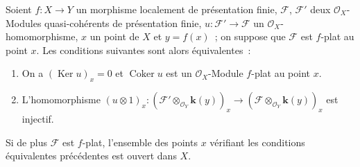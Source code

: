 
\begin{proposition}[11.3.7]
\label{IV.11.3.7-fr}
Soient $f:X\to Y$ un morphisme localement de présentation finie,
$\mathcal F$, $\mathcal F'$ deux $\mathcal O_X$-Modules quasi-cohérents de
présentation finie, $u:\mathcal F'\to\mathcal F$ un
$\mathcal O_X$-homomorphisme, $x$ un point de $X$ et $y=f(x)$~; on suppose que
$\mathcal F$ est $f$-plat au point $x$. Les conditions suivantes sont alors
équivalentes~:
\begin{enumerate}[label=\emph{\alph*)}]
\item On a $(\operatorname{Ker}u)_x=0$ et $\operatorname{Coker}u$ est un
$\mathcal O_X$-Module $f$-plat au point $x$.
\item L'homomorphisme
$(u\otimes1)_x:(\mathcal F'\otimes_{\mathcal O_Y}\boldsymbol{k}(y))_x
\longrightarrow(\mathcal F\otimes_{\mathcal O_Y}\boldsymbol{k}(y))_x$
est injectif.
\end{enumerate}

Si de plus $\mathcal F$ est $f$-plat, l'ensemble des points $x$ vérifiant les
conditions équivalentes précédentes est ouvert dans $X$.
\end{proposition}

